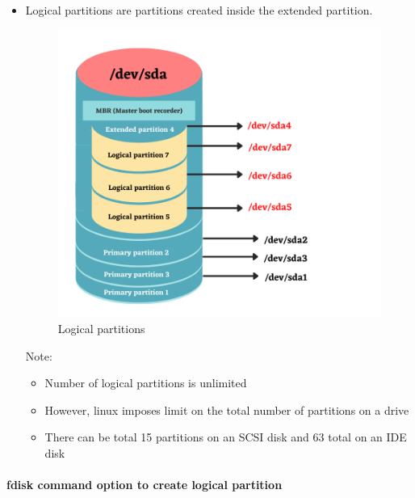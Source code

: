 \setlength{\columnsep}{3pt}
\begin{flushleft}

	\begin{itemize}
		\item Logical partitions are partitions created inside the extended partition.
		\begin{figure}[h!]
			\centering
			\includegraphics[scale=.6]{content/chapter8/images/logical.png}
			\caption{Logical partitions}
			\label{logical_naming}
		\end{figure}		
		
		\begin{tcolorbox}[breakable,notitle,boxrule=-2pt,colback=yellow,colframe=yellow]
			\color{black}
			Note: 
			\begin{itemize}
				\item Number of logical partitions is unlimited
				\item However, linux imposes limit on the total number of partitions on a drive
				\item There can be total 15 partitions on an SCSI disk and 63 total on an IDE disk
			\end{itemize}
		\end{tcolorbox}
		
	\end{itemize}


\newpage

\paragraph{fdisk command option to create logical partition}


\end{flushleft}
